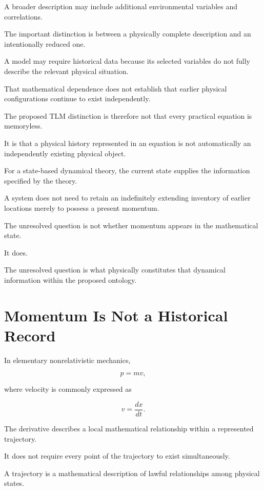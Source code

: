 \documentclass[12pt,onecolumn]{article}
\begin{document}
A broader description may include additional environmental variables and correlations.

The important distinction is between a physically complete description and an intentionally reduced one.

A model may require historical data because its selected variables do not fully describe the relevant physical situation.

That mathematical dependence does not establish that earlier physical configurations continue to exist independently.

The proposed TLM distinction is therefore not that every practical equation is memoryless.

It is that a physical history represented in an equation is not automatically an independently existing physical object.

For a state-based dynamical theory, the current state supplies the information specified by the theory.

A system does not need to retain an indefinitely extending inventory of earlier locations merely to possess a present momentum.

The unresolved question is not whether momentum appears in the mathematical state.

It does.

The unresolved question is what physically constitutes that dynamical information within the proposed ontology.


\section{Momentum Is Not a Historical Record}

In elementary nonrelativistic mechanics,

\begin{equation}
p=mv,
\end{equation}

where velocity is commonly expressed as

\begin{equation}
v=\frac{dx}{dt}.
\end{equation}

The derivative describes a local mathematical relationship within a represented trajectory.

It does not require every point of the trajectory to exist simultaneously.

A trajectory is a mathematical description of lawful relationships among physical states.
\end{document}
